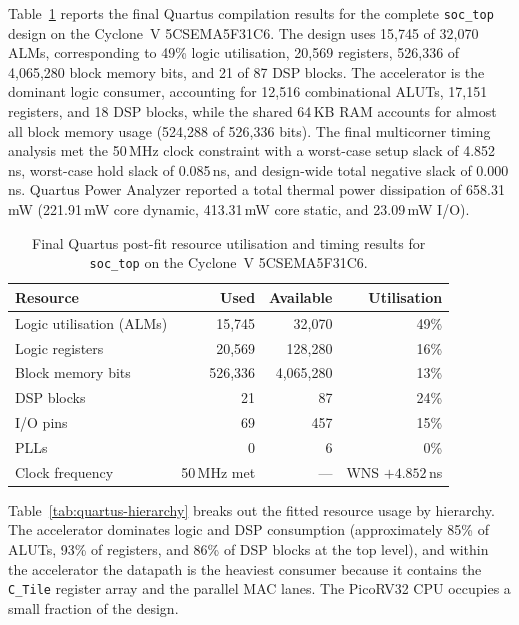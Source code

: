 Table~\ref{tab:quartus-final} reports the final Quartus compilation
results for the complete \texttt{soc\_top} design on the Cyclone~V
5CSEMA5F31C6. The design uses 15,745 of 32,070 ALMs, corresponding to
49\% logic utilisation, 20,569 registers, 526,336 of 4,065,280 block
memory bits, and 21 of 87 DSP blocks. The accelerator is the dominant
logic consumer, accounting for 12,516 combinational ALUTs, 17,151
registers, and 18 DSP blocks, while the shared 64\,KB RAM accounts for
almost all block memory usage (524,288 of 526,336 bits). The final
multicorner timing analysis met the 50\,MHz clock constraint with a
worst-case setup slack of 4.852\,ns, worst-case hold slack of 0.085\,ns,
and design-wide total negative slack of 0.000\,ns. Quartus Power
Analyzer reported a total thermal power dissipation of 658.31\,mW
(221.91\,mW core dynamic, 413.31\,mW core static, and 23.09\,mW I/O).

\begin{table}[htbp]
  \centering
  \small
   \setlength{\tabcolsep}{10pt} %
  \begin{tabular}{lrrr}
  \toprule
  Resource & Used & Available & Utilisation \\
  \midrule
  Logic utilisation (ALMs) & 15,745 & 32,070 & 49\% \\
  Logic registers          & 20,569 & 128,280 & 16\% \\
  Block memory bits        & 526,336 & 4,065,280 & 13\% \\
  DSP blocks               & 21 & 87 & 24\% \\
  I/O pins                 & 69 & 457 & 15\% \\
  PLLs                     & 0 & 6 & 0\% \\
  Clock frequency          & 50\,MHz met & --- & WNS $+4.852$\,ns \\
  \bottomrule
  \end{tabular}
  \caption{Final Quartus post-fit resource utilisation and timing results
           for \texttt{soc\_top} on the Cyclone~V 5CSEMA5F31C6.}
  \label{tab:quartus-final}
\end{table}

Table~\ref{tab:quartus-hierarchy} breaks out the fitted resource usage
by hierarchy. The accelerator dominates logic and DSP consumption
(approximately 85\% of ALUTs, 93\% of registers, and 86\% of DSP blocks
at the top level), and within the accelerator the datapath is the
heaviest consumer because it contains the \texttt{C\_Tile} register
array and the parallel MAC lanes. The PicoRV32 CPU occupies a small
fraction of the design.

